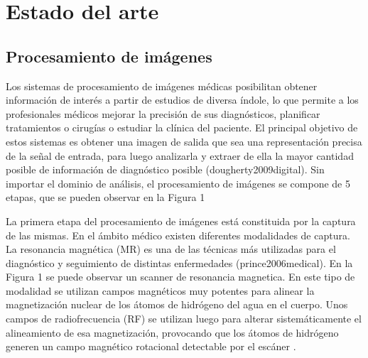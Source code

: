 \chapter{Estado del arte}
\section{Procesamiento de imágenes}
Los sistemas de procesamiento de imágenes médicas posibilitan obtener información de interés a partir de estudios de diversa índole, lo que permite a los profesionales médicos mejorar la precisión de sus diagnósticos, planificar tratamientos o cirugías o estudiar la clínica del paciente. El principal objetivo de estos sistemas es obtener una imagen de salida que sea una representación precisa de la señal de entrada, para luego analizarla y extraer de ella la mayor cantidad posible de información de diagnóstico posible (dougherty2009digital). Sin importar el dominio de análisis, el procesamiento de imágenes se compone de 5 etapas, que se pueden observar en la Figura 1 


La primera etapa del procesamiento de imágenes está constituida por la captura de las mismas. En el ámbito médico existen diferentes modalidades de captura. La resonancia magnética (MR) es una de las técnicas más utilizadas para el diagnóstico y seguimiento de distintas enfermedades (prince2006medical). En la Figura 1 se puede observar un scanner de resonancia magnetica.  En este tipo de modalidad se utilizan campos magnéticos muy potentes para alinear la magnetización nuclear de los átomos  de hidrógeno del agua en el cuerpo. Unos campos de radiofrecuencia (RF) se utilizan luego para alterar sistemáticamente el alineamiento de esa magnetización, provocando que los átomos de hidrógeno generen un campo magnético rotacional detectable por el escáner \citep{novelline2004squire}.

